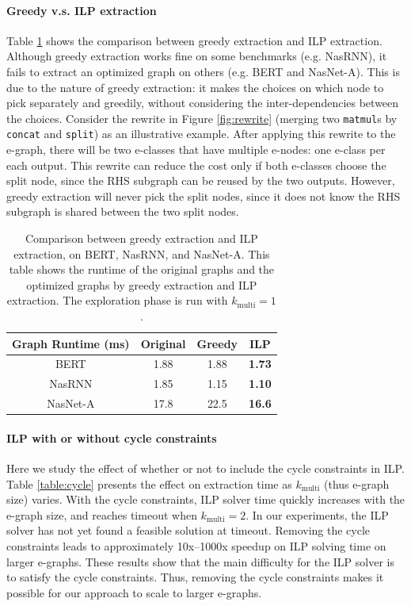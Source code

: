 \documentclass{article}
\begin{document}
\paragraph{Greedy v.s. ILP extraction}
Table \ref{table:extraction} shows the comparison between greedy extraction and ILP extraction. 
Although greedy extraction works fine on some benchmarks (e.g. NasRNN), it fails to extract an optimized graph on others (e.g. BERT and NasNet-A). 
This is due to the nature of greedy extraction: it makes the choices on which node to pick separately and greedily, without considering the inter-dependencies between the choices.
Consider the rewrite in Figure \ref{fig:rewrite} (merging two \texttt{matmul}s by \texttt{concat} and \texttt{split}) as an illustrative example. 
After applying this rewrite to the e-graph, there will be two e-classes that have multiple e-nodes: one e-class per each output. 
This rewrite can reduce the cost only if both e-classes choose the split node, since the RHS subgraph can be reused by the two outputs. 
However, greedy extraction will never pick the split nodes, since it does not know the RHS subgraph is shared between the two split nodes.

\begin{table}[]
    \centering
    \footnotesize
    \begin{tabular}{cccc}
    \toprule
        {\bf Graph Runtime (ms)} & {\bf Original} & {\bf Greedy} & {\bf ILP} \\
    \midrule
        BERT & 1.88 & 1.88 & \textbf{1.73} \\
        NasRNN & 1.85 & 1.15 & \textbf{1.10} \\
        NasNet-A & 17.8 & 22.5 & \textbf{16.6} \\
    \bottomrule
    \end{tabular}
    \caption{Comparison between greedy extraction and ILP extraction, on BERT, NasRNN, and NasNet-A. 
    This table shows the runtime of the original graphs and the optimized graphs by greedy extraction and ILP extraction. 
    The exploration phase is run with $k_{\textrm{multi}} = 1$. }
    \label{table:extraction}
\end{table}

\paragraph{ILP with or without cycle constraints}

Here we study the effect of whether or not to include the cycle constraints in ILP. 
Table \ref{table:cycle} presents the effect on extraction time as $k_{\textrm{multi}}$ (thus e-graph size) varies. 
With the cycle constraints, ILP solver time quickly increases with the e-graph size, and reaches timeout when $k_{\textrm{multi}}=2$. 
In our experiments, the ILP solver has not yet found a feasible solution at timeout. 
Removing the cycle constraints leads to approximately 10x--1000x speedup on ILP solving time on larger e-graphs.
These results show that the main difficulty for the ILP solver is to satisfy the cycle constraints.  
Thus, removing the cycle constraints makes it possible for our approach to scale to larger e-graphs. 
\end{document}
